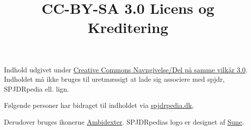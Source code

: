 \documentclass[a4paper]{article}
\title{CC-BY-SA 3.0 Licens og Kreditering}
\date{\vspace{-5ex}}
\author{\vspace{-5ex}}
\begin{document}

\maketitle

Indhold udgivet under \href{http://creativecommons.org/licenses/by-sa/3.0/deed.da}{Creative Commons Navngivelse/Del på samme vilkår 3.0}. Indholdet må ikke bruges til uretmæssigt at lade sig associere med spjdr, SPJDRpedia ell. lign.

Følgende personer har bidraget til indholdet via \href{http://spjdrpedia.dk/wiki/Forside}{spjdrpedia.dk},



Derudover bruges ikonerne \href{http://spjdrpedia.dk/wiki/Ambidexter}{Ambidexter}. SPJDRpedias logo er designet af \href{http://spjdrpedia.dk/wiki/Bruger:Suneamstrup}{Sune}.
\end{document}
